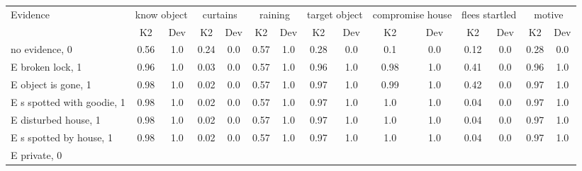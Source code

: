 \begin{table}\begin{tabular}{l|cc|cc|cc|cc|cc|cc|cc}\toprule\multirow{2}{*}{Evidence} & \multicolumn{2}{c}{know object}& \multicolumn{2}{c}{curtains}& \multicolumn{2}{c}{raining}& \multicolumn{2}{c}{target object}& \multicolumn{2}{c}{compromise house}& \multicolumn{2}{c}{flees startled}& \multicolumn{2}{c}{motive}\\& {K2} & {Dev}& {K2} & {Dev}& {K2} & {Dev}& {K2} & {Dev}& {K2} & {Dev}& {K2} & {Dev}& {K2} & {Dev}\\\midrule
no evidence, 0 & 0.56&1.0&\cellcolor{Bittersweet}0.24&\cellcolor{Bittersweet}0.0&0.57&1.0&\cellcolor{Bittersweet}0.28&\cellcolor{Bittersweet}0.0&\cellcolor{Bittersweet}0.1&\cellcolor{Bittersweet}0.0&\cellcolor{Bittersweet}0.12&\cellcolor{Bittersweet}0.0&\cellcolor{Bittersweet}0.28&\cellcolor{Bittersweet}0.0\\E broken lock, 1 & \cellcolor{Bittersweet}0.96&\cellcolor{Bittersweet}1.0&\cellcolor{Bittersweet}0.03&\cellcolor{Bittersweet}0.0&0.57&1.0&\cellcolor{Bittersweet}0.96&\cellcolor{Bittersweet}1.0&\cellcolor{Bittersweet}0.98&\cellcolor{Bittersweet}1.0&0.41&0.0&\cellcolor{Bittersweet}0.96&\cellcolor{Bittersweet}1.0\\E object is gone, 1 & \cellcolor{Bittersweet}0.98&\cellcolor{Bittersweet}1.0&\cellcolor{Bittersweet}0.02&\cellcolor{Bittersweet}0.0&0.57&1.0&\cellcolor{Bittersweet}0.97&\cellcolor{Bittersweet}1.0&\cellcolor{Bittersweet}0.99&\cellcolor{Bittersweet}1.0&0.42&0.0&\cellcolor{Bittersweet}0.97&\cellcolor{Bittersweet}1.0\\E s spotted with goodie, 1 & \cellcolor{Bittersweet}0.98&\cellcolor{Bittersweet}1.0&\cellcolor{Bittersweet}0.02&\cellcolor{Bittersweet}0.0&0.57&1.0&\cellcolor{Bittersweet}0.97&\cellcolor{Bittersweet}1.0&\cellcolor{Bittersweet}1.0&\cellcolor{Bittersweet}1.0&\cellcolor{Bittersweet}0.04&\cellcolor{Bittersweet}0.0&\cellcolor{Bittersweet}0.97&\cellcolor{Bittersweet}1.0\\E disturbed house, 1 & \cellcolor{Bittersweet}0.98&\cellcolor{Bittersweet}1.0&\cellcolor{Bittersweet}0.02&\cellcolor{Bittersweet}0.0&0.57&1.0&\cellcolor{Bittersweet}0.97&\cellcolor{Bittersweet}1.0&\cellcolor{Bittersweet}1.0&\cellcolor{Bittersweet}1.0&\cellcolor{Bittersweet}0.04&\cellcolor{Bittersweet}0.0&\cellcolor{Bittersweet}0.97&\cellcolor{Bittersweet}1.0\\E s spotted by house, 1 & \cellcolor{Bittersweet}0.98&\cellcolor{Bittersweet}1.0&\cellcolor{Bittersweet}0.02&\cellcolor{Bittersweet}0.0&0.57&1.0&\cellcolor{Bittersweet}0.97&\cellcolor{Bittersweet}1.0&\cellcolor{Bittersweet}1.0&\cellcolor{Bittersweet}1.0&\cellcolor{Bittersweet}0.04&\cellcolor{Bittersweet}0.0&\cellcolor{Bittersweet}0.97&\cellcolor{Bittersweet}1.0\\E private, 0 & 
\end{tabular}
\end{table}
